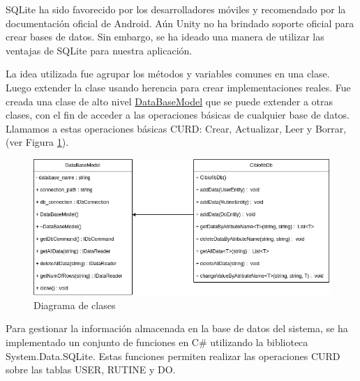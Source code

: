 SQLite ha sido favorecido por los desarrolladores móviles y recomendado por la documentación oficial de Android. Aún Unity no ha brindado soporte oficial para crear bases de datos. Sin embargo, se ha ideado una manera de utilizar las ventajas de SQLite para nuestra aplicación.

La idea utilizada fue agrupar los métodos y variables comunes en una clase. Luego extender la clase usando herencia para crear implementaciones reales. Fue creada una clase de alto nivel \underline{DataBaseModel}  que se puede extender a otras clases, con el fin de acceder a las operaciones básicas de cualquier base de datos. Llamamos a estas operaciones básicas CURD: Crear, Actualizar, Leer y Borrar, (ver Figura \ref{fig: diagram-db}).

\begin{figure}[ht]
    \centering
    \includegraphics[scale=0.6]{images/diagram-db.png}
    \caption{Diagrama de clases}
    \label{fig: diagram-db}
\end{figure}

Para gestionar la información almacenada en la base de datos del sistema, se ha implementado un conjunto de funciones en C\# utilizando la biblioteca System.Data.SQLite. Estas funciones permiten realizar las operaciones CURD sobre las tablas USER, RUTINE y DO.

